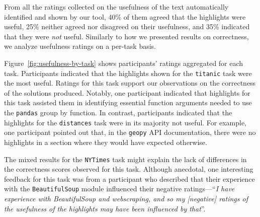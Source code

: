 From all the ratings collected on the  usefulness of the text automatically identified and shown by our tool, 40\% of them agreed that the highlights were useful, 
25\% neither agreed nor disagreed on their usefulness, and 35\% indicated that they were \textit{not} useful.
Similarly to how we presented results on correctness, we analyze usefulness ratings on a per-task basis.  



Figure~\ref{fig:usefulness-by-task} shows participants' ratings aggregated for each task. 
Participants indicated that the highlights shown for the \texttt{titanic} task were the most useful. 
Ratings for this task support our observations on the correctness of the solutions produced. 
Notably, one participant indicated that highlights for this task assisted them in identifying essential function arguments needed to use the \texttt{pandas} group by function.
In contrast, participants indicated that the highlights for the \texttt{distances} task were in its majority not useful. 
For example, one participant pointed out that, in the \texttt{geopy} API documentation, there were no highlights in 
a section where they would have expected otherwise.




The mixed results for the \texttt{NYTimes} task might explain the lack of differences in the correctness scores observed for this task. 
Although anecdotal, one interesting feedback for this task was from a participant who described that 
their experience with the \texttt{BeautifulSoup} module influenced their negative ratings---``\textit{I have experience with BeautifulSoup and webscraping, and so my [negative] ratings of the usefulness of the highlights may have been influenced by that}''.





